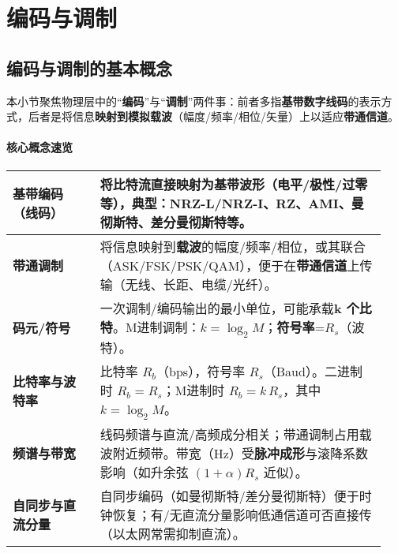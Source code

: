 \documentclass[lang=cn,newtx,10pt,scheme=chinese]{../../elegantbook}
\begin{document}
\begin{center}
{\setlength{\fboxsep}{6pt}%
}%
\end{center}

\section{编码与调制}
\subsection{编码与调制的基本概念}
本小节聚焦物理层中的“\textbf{编码}”与“\textbf{调制}”两件事：前者多指\textbf{基带数字线码}的表示方式，后者是将信息\textbf{映射到模拟载波}（幅度/频率/相位/矢量）上以适应\textbf{带通信道}。

\paragraph{核心概念速览}
{\small\begin{longtable}{|p{0.22\linewidth}|p{0.72\linewidth}|}
\hline
    	\textbf{基带编码（线码）} & 将比特流直接映射为\textbf{基带波形}（电平/极性/过零等），典型：NRZ-L/NRZ-I、RZ、AMI、曼彻斯特、差分曼彻斯特等。\\
\hline
    	\textbf{带通调制} & 将信息映射到\textbf{载波}的幅度/频率/相位，或其联合（ASK/FSK/PSK/QAM），便于在\textbf{带通信道}上传输（无线、长距、电缆/光纤）。\\
\hline
    	\textbf{码元/符号} & 一次调制/编码输出的最小单位，可能承载\textbf{k 个比特}。M进制调制：$k=\log_2 M$；\textbf{符号率}=$R_s$（波特）。\\
\hline
    	\textbf{比特率与波特率} & 比特率 $R_b$（bps），符号率 $R_s$（Baud）。二进制时 $R_b=R_s$；M进制时 $R_b=k\,R_s$，其中 $k=\log_2 M$。\\
\hline
    	\textbf{频谱与带宽} & 线码频谱与直流/高频成分相关；带通调制占用载波附近频带。带宽（Hz）受\textbf{脉冲成形}与滚降系数影响（如升余弦 $(1+\alpha)R_s$ 近似）。\\
\hline
    	\textbf{自同步与直流分量} & 自同步编码（如曼彻斯特/差分曼彻斯特）便于时钟恢复；有/无直流分量影响低通信道可否直接传（以太网常需抑制直流）。\\
\hline
\end{longtable}}
\end{document}

